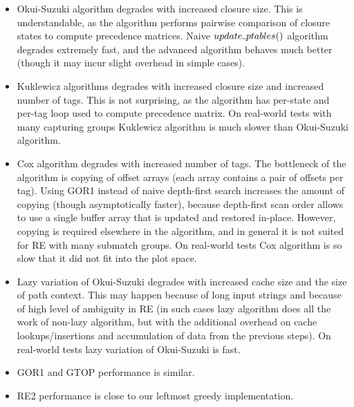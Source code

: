 \documentclass[AMA,STIX1COL]{WileyNJD-v2}
\newcommand{\Xund}{\rule{.4em}{.4pt}}
\begin{document}
\begin{itemize}[itemsep=0.5em]
    \item Okui-Suzuki algorithm degrades with increased closure size.
        This is understandable, as the algorithm performs pairwise comparison of closure states to compute precedence matrices.
        Naive $update \Xund ptables ()$ algorithm degrades extremely fast,
        and the advanced algorithm behaves much better (though it may incur slight overhead in simple cases).

    \item Kuklewicz algorithms degrades with increased closure size and increased number of tags.
        This is not surprising, as the algorithm has per-state and per-tag loop used to compute precedence matrix.
        On real-world tests with many capturing groups Kuklewicz algorithm is much slower than Okui-Suzuki algorithm.

    \item Cox algorithm degrades with increased number of tags.
        The bottleneck of the algorithm is copying of offset arrays
        (each array contains a pair of offsets per tag).
        Using GOR1 instead of naive depth-first search increases the amount of copying (though asymptotically faster),
        because depth-first scan order allows to use a single buffer array that is updated and restored in-place.
        However, copying is required elsewhere in the algorithm,
        and in general it is not suited for RE with many submatch groups.
        On real-world tests Cox algorithm is so slow that it did not fit into the plot space.

    \item Lazy variation of Okui-Suzuki degrades with increased cache size and the size of path context.
        This may happen because of long input strings and because of high level of ambiguity in RE
        (in such cases lazy algorithm does all the work of non-lazy algorithm,
        but with the additional overhead on cache lookups/insertions and accumulation of data from the previous steps).
        On real-world tests lazy variation of Okui-Suzuki is fast.

    \item GOR1 and GTOP performance is similar.

    \item RE2 performance is close to our leftmost greedy implementation.
    \\[-0.5em]
\end{itemize}
\end{document}
